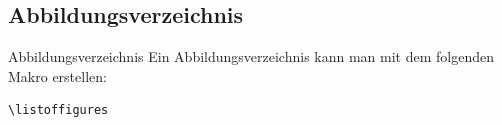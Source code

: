\subsection{Abbildungsverzeichnis}
\begin{frame}[fragile]{Abbildungsverzeichnis}
Ein Abbildungsverzeichnis kann man mit dem folgenden Makro erstellen:

\begin{lstlisting}[style=tex]
\listoffigures
\end{lstlisting}

\end{frame}
